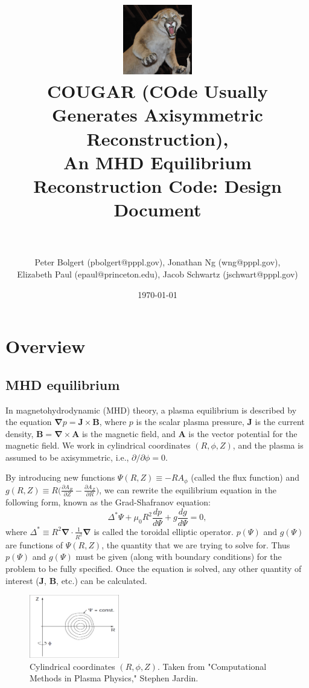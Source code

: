\documentclass[paper=letter, fontsize=11pt]{scrartcl} %
\title{	
\includegraphics[width=3cm]{Cougar_Nevada}
\normalfont \normalsize 
\horrule{0.5pt} \\[0.4cm] %
\LARGE COUGAR (\textbf{CO}de \textbf{U}sually \textbf{G}enerates \textbf{A}xisymmetric \textbf{R}econstruction), \\ \Large An MHD Equilibrium Reconstruction Code:  Design Document\\ %
\horrule{2pt} \\[0.5cm] %
}
\author{Peter Bolgert (pbolgert@pppl.gov), Jonathan Ng (wng@pppl.gov), \\ Elizabeth Paul (epaul@princeton.edu), Jacob Schwartz (jschwart@pppl.gov)} %
\date{\normalsize\today} %
\begin{document}
\maketitle %


\section{Overview}

\subsection{MHD equilibrium}

In magnetohydrodynamic (MHD) theory, a plasma equilibrium is described by the equation $\mathbf{\nabla} p = \mathbf{J} \times \mathbf{B}$, where $p$ is the scalar plasma pressure, $\mathbf{J}$ is the current density, $\mathbf{B} = \mathbf{\nabla} \times \mathbf{A}$ is the magnetic field, and $\mathbf{A}$ is the vector potential for the magnetic field.  We work in cylindrical coordinates $(R, \phi, Z)$, and the plasma is assumed to be axisymmetric, i.e., $\partial / \partial \phi = 0$.

By introducing new functions $\Psi(R,Z) \equiv -R A_{\phi}$ (called the flux function) and $g(R,Z) \equiv R \big(\frac{\partial A_R}{\partial Z} - \frac{\partial A_Z}{\partial R}\big)$, we can rewrite the equilibrium equation in the following form, known as the Grad-Shafranov equation:
\begin{equation}
\Delta^{*} \Psi + \mu_0 R^2 \frac{dp}{d\Psi} + g \frac{dg}{d\Psi} = 0,
\end{equation}
where $\Delta^{*} \equiv R^2 \mathbf{\nabla} \cdot \frac{1}{R^2} \mathbf{\nabla}$ is called the toroidal elliptic operator. $p(\Psi)$ and $g(\Psi)$ are functions of $\Psi(R,Z)$, the quantity that we are trying to solve for.  Thus $p(\Psi)$ and $g(\Psi)$ must be given (along with boundary conditions) for the problem to be fully specified.  Once the equation is solved, any other quantity of interest ($\mathbf{J}$, $\mathbf{B}$, etc.) can be calculated.  

\begin{figure}
\centering
\captionsetup{justification=centering,margin=3cm}
\caption[caption]{Cylindrical coordinates $(R,\phi,Z)$.  Taken from "Computational Methods in Plasma Physics," Stephen Jardin.}

\includegraphics[width=0.35\textwidth]{coordinates}

\end{figure}
\end{document}
